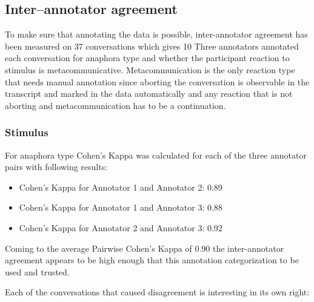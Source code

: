 \subsection{Inter--annotator agreement}

To make sure that annotating the data is possible,
inter-annotator agreement has been measured on 37 conversations which gives 10%
Three annotators annotated each conversation for anaphora type and
whether the participant reaction to stimulus is metacommunicative.
Metacommunication is the only reaction type that needs manual annotation since
aborting the conversation is
observable in the transcript and marked in the data automatically
and any reaction that is not aborting and metacommunication has to be a continuation.

\subsubsection{Stimulus}

For anaphora type Cohen's Kappa was calculated for each of the three annotator pairs
with following results:

\begin{itemize}[label={}]
    \item Cohen's Kappa for Annotator 1 and Annotator 2: 0.89
    \item Cohen's Kappa for Annotator 1 and Annotator 3: 0.88
    \item Cohen's Kappa for Annotator 2 and Annotator 3: 0.92
\end{itemize}

Coming to the average Pairwise Cohen's Kappa of 0.90
the inter-annotator agreement appears to be high enough
that this annotation categorization to be used and trusted.

Each of the conversations that caused disagreement is interesting in its own right:


